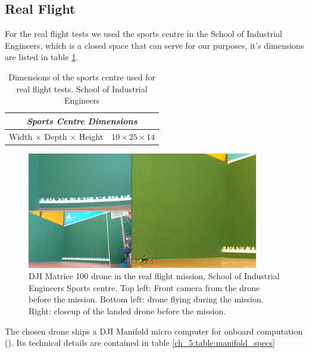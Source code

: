   \subsection{Real Flight} \label{ch_5:subsect:exp_real_flight}

    For the real flight tests we used the sports centre in the School of Industrial Engineers, which is a closed space that can serve for our purposes, it's dimensions are listed in table \ref{ch_5:table:sports_dims}.

    \begin{table}[!h]
      \centering
      \begin{tabular}{lr} \toprule
        \multicolumn{2}{c}{\textit{Sports Centre Dimensions}}        \\ \midrule
        Width $\times$ Depth $\times$ Height & $10 \times 25 \times 14$ \\ \bottomrule
        \hline
      \end{tabular}
      \caption{Dimensions of the sports centre used for real flight tests. School of Industrial Engineers}
      \label{ch_5:table:sports_dims}
    \end{table}

    \begin{figure}
      \centering
      \includegraphics[width=0.9\textwidth,height=0.5\textheight,keepaspectratio]{./Figures/RealFlight.png}
      \caption{DJI Matrice 100 drone in the real flight mission, School of Industrial Engineers Sports centre. Top left: Front camera from the drone before the mission. Bottom left: drone flying during the mission. Right: closeup of the landed drone before the mission.}
      \label{ch_5:fig:full_realflight}
    \end{figure}


    The chosen drone ships a DJI Manifold micro computer for onboard computation (\cite{dji_manifold_web}). Its technical details are contained in table \ref{ch_5:table:manifold_specs}

